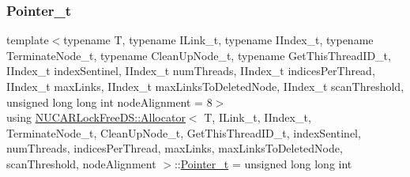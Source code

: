 \mbox{\label{class_n_u_c_a_r_lock_free_d_s_1_1_allocator_a3931e84d06ddd3b436103475197eb12a}} 
\subsubsection{\texorpdfstring{Pointer\+\_\+t}{Pointer\_t}}
{\footnotesize\ttfamily template$<$typename T, typename I\+Link\+\_\+t, typename I\+Index\+\_\+t, typename Terminate\+Node\+\_\+t, typename Clean\+Up\+Node\+\_\+t, typename Get\+This\+Thread\+I\+D\+\_\+t, I\+Index\+\_\+t index\+Sentinel, I\+Index\+\_\+t num\+Threads, I\+Index\+\_\+t indices\+Per\+Thread, I\+Index\+\_\+t max\+Links, I\+Index\+\_\+t max\+Links\+To\+Deleted\+Node, I\+Index\+\_\+t scan\+Threshold, unsigned long long int node\+Alignment = 8$>$ \\
using \mbox{\hyperlink{class_n_u_c_a_r_lock_free_d_s_1_1_allocator}{N\+U\+C\+A\+R\+Lock\+Free\+D\+S\+::\+Allocator}}$<$ T, I\+Link\+\_\+t, I\+Index\+\_\+t, Terminate\+Node\+\_\+t, Clean\+Up\+Node\+\_\+t, Get\+This\+Thread\+I\+D\+\_\+t, index\+Sentinel, num\+Threads, indices\+Per\+Thread, max\+Links, max\+Links\+To\+Deleted\+Node, scan\+Threshold, node\+Alignment $>$\+::\mbox{\hyperlink{class_n_u_c_a_r_lock_free_d_s_1_1_allocator_a3931e84d06ddd3b436103475197eb12a}{Pointer\+\_\+t}} =  unsigned long long int}

\mbox{\label{class_n_u_c_a_r_lock_free_d_s_1_1_allocator_aa7636b4884545094b9532cc295604b17}} 
